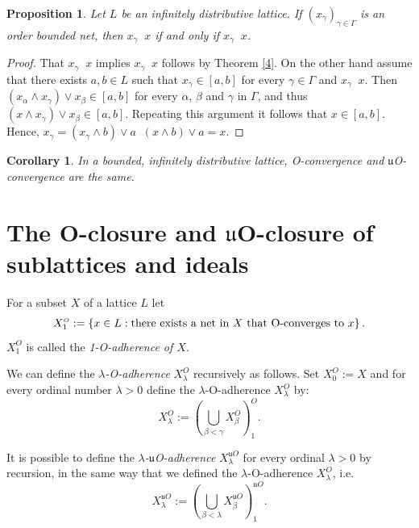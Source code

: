 \documentclass[12pt,a4paper]{amsart}
\numberwithin{equation}{section}
\newtheorem{cor}[thm]{Corollary}
\newtheorem{prop}[thm]{Proposition}
\theoremstyle{definition}
\newcommand{\sss}[1]{{\scriptscriptstyle #1}}
\newcommand{\converges}[1]{\mathop{\overset{\text{#1}}{\longrightarrow}}}
\begin{document}
\begin{prop}\label{37}
Let $L$ be an infinitely distributive lattice. If $(x_{\gamma})_{\gamma \in \Gamma}$ is an order bounded net, then $x_{\gamma} \converges{{$\mathfrak{u}$O}} x$ if and only if $x_{\gamma} \converges{O} x$.
\end{prop}
\begin{proof}
	That $x_{\gamma} \converges{O} x$ implies $x_{\gamma} \converges{{$\mathfrak{u}$O}} x$ follows by Theorem \ref{4}. On the  other hand assume that there exists $a,b \in L$ such that $x_{\gamma} \in [a,b]$ for every $\gamma \in \Gamma$ and $x_{\gamma} \converges{{$\mathfrak{u}$O}} x$. Then $(x_{\alpha} \wedge x_{\gamma}) \vee x_{\beta} \in [a,b]$ for every $\alpha$, $\beta$ and $\gamma$ in $\Gamma$, and thus $(x \wedge x_{\gamma}) \vee x_{\beta} \in [a,b]$. Repeating this argument it follows that $x \in [a,b]$. Hence, $x_{\gamma} = (x_{\gamma} \wedge b) \vee a \converges{O} (x \wedge b) \vee a = x$.
\end{proof}



\begin{cor}
  In a bounded, infinitely distributive lattice, O-convergence and $\mathfrak{u}$O-convergence are the same.
\end{cor}

\section{The O-closure and $\mathfrak{u}$O-closure of sublattices and ideals}

For a subset $ X$ of a lattice $L$ let
\[ X^{\sss{O}}_1:=\{x\in L:\mbox{there exists a net in $ X$ that O-converges to $x$}\}\,.\]
$ X^{\sss{O}}_1$ is called the \emph{1-O-adherence of $ X$}. 

We can define the  \textit{$\lambda$-O-adherence}  $ X^{\sss{{O}}}_\lambda$ recursively as follows. Set $ X^{\sss{O}}_0:= X$ and for every ordinal number $\lambda> 0$ define the  $\lambda$-O-adherence  $ X^{\sss{{O}}}_\lambda$ by:
\[ X^{\sss{{O}}}_\lambda:=\left(\bigcup_{\beta<\gamma} X^{\sss{{O}}}_\beta\right)^{\sss{O}}_1.\]


It is possible to define the \textit{$\lambda$-$\mathfrak u$O-adherence} $ X^{\sss{\mathfrak{u}{O}}}_\lambda$ for every ordinal $\lambda> 0$ by recursion, in the same way that we defined the $\lambda$-O-adherence  $ X^{\sss{{O}}}_\lambda$, i.e.\[ X^{\sss{\mathfrak{u}{O}}}_\lambda:=\left(\bigcup_{\beta<\lambda} X^{\sss{\mathfrak{u}{O}}}_\beta\right)^{\sss{\mathfrak{u}O}}_1.\]
\end{document}
